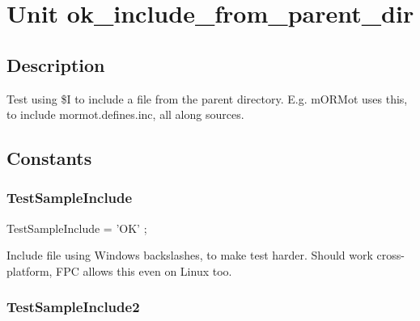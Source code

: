 \documentclass{report}
\newif\ifpdf
\begin{document}
\label{toc}\tableofcontents
\newpage
\newlength{\tmplength}
\chapter{Unit ok{\_}include{\_}from{\_}parent{\_}dir}
\label{ok_include_from_parent_dir}
\section{Description}
Test using {\$}I to include a file from the parent directory. E.g. mORMot uses this, to include mormot.defines.inc, all along sources.
\section{Constants}
\ifpdf
\subsection*{\large{\textbf{TestSampleInclude}}\normalsize\hspace{1ex}\hrulefill}
\else
\subsection*{TestSampleInclude}
\fi
\label{ok_include_from_parent_dir-TestSampleInclude}
\begin{list}{}{
\setlength{\itemindent}{0cm}
\setlength{\listparindent}{0cm}
\setlength{\leftmargin}{\evensidemargin}
\addtolength{\leftmargin}{\tmplength}
\settowidth{\labelsep}{X}
\addtolength{\leftmargin}{\labelsep}
\setlength{\labelwidth}{\tmplength}
}
\item[\textbf{Declaration}\hfill]
\ifpdf
\begin{flushleft}
\fi
\begin{ttfamily}
TestSampleInclude =  'OK' ;\end{ttfamily}

\ifpdf
\end{flushleft}
\fi

\par
\item[\textbf{Description}]
Include file using Windows backslashes, to make test harder. Should work cross{-}platform, FPC allows this even on Linux too.

\end{list}
\ifpdf
\subsection*{\large{\textbf{TestSampleInclude2}}\normalsize\hspace{1ex}\hrulefill}
\else
\end{document}
